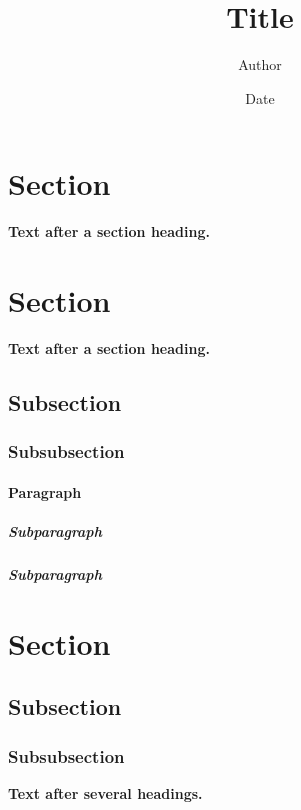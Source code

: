 \documentclass[10pt]{kharticle}
\title{Title}
\author{Author}
\date{Date}
\begin{document}
\maketitle

\begin{abstract}
\lipsum[1][1-15]
\end{abstract}

\section{Section}
\textbf{Text after a section heading.}
\lipsum[2-3]

\section{Section}
\textbf{Text after a section heading.}
\lipsum[4][1-10]

\subsection{Subsection}
\lipsum[5][1-10]

\subsubsection{Subsubsection}
\lipsum[5][1-10]

\paragraph{Paragraph}
\lipsum[5][1-10]

\subparagraph{Subparagraph}
\lipsum[5][1-10]
\subparagraph{Subparagraph}
\lipsum[5][1-10]


\section{Section}
\subsection{Subsection}
\subsubsection{Subsubsection}
\textbf{Text after several headings.}
\lipsum[6][1-10]
\end{document}
